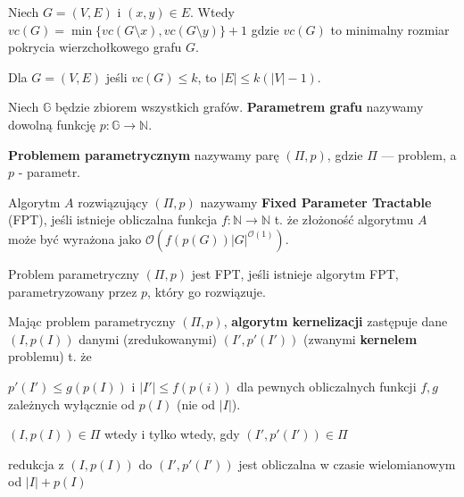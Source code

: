 \begin{lemat}
    Niech $G = (V, E)$ i $(x, y) \in E$. Wtedy
    $vc(G) = \min \{vc(G \setminus x), vc(G \setminus y)\} + 1$
    gdzie $vc(G)$ to minimalny rozmiar pokrycia wierzchołkowego grafu $G$.
\end{lemat}

\begin{lemat}
    Dla $G = (V, E)$ jeśli $vc(G) \leq k$, to $|E| \leq k(|V| - 1)$.
\end{lemat}

\begin{definicja}
    Niech $\mathbb{G}$ będzie zbiorem wszystkich grafów. \textbf{Parametrem grafu}
    nazywamy dowolną funkcję $p : \mathbb{G} \rightarrow \mathbb{N}$.
\end{definicja}

\begin{definicja}
   \textbf{Problemem parametrycznym} nazywamy parę $(\Pi, p)$, gdzie $\Pi$ --- problem, a $p$ - parametr.
\end{definicja}

\begin{definicja}
    Algorytm $A$ rozwiązujący $(\Pi, p)$ nazywamy \textbf{Fixed Parameter Tractable} (FPT),
    jeśli istnieje obliczalna funkcja $f : \mathbb{N} \rightarrow \mathbb{N}$ t. że złożoność
    algorytmu $A$ może być wyrażona jako $\mathcal{O}(f(p(G))|G|^{\mathcal{O}(1)})$.
\end{definicja}

\begin{definicja}
    Problem parametryczny $(\Pi, p)$ jest FPT, jeśli istnieje algorytm FPT,
    parametryzowany przez $p$, który go rozwiązuje.
\end{definicja}

\begin{definicja}
    Mając problem parametryczny $(\Pi, p)$, \textbf{algorytm kernelizacji} zastępuje dane
    $(I, p(I))$ danymi (zredukowanymi) $(I', p'(I'))$ (zwanymi \textbf{kernelem} problemu) t. że
    \begin{enumerate*}[label=\roman*)]
        \item $p'(I') \leq g(p(I))$ i $|I'| \leq f(p(i))$ dla pewnych obliczalnych funkcji $f, g$ zależnych
        wyłącznie od $p(I)$ (nie od $|I|$).
        \item $(I, p(I)) \in \Pi$ wtedy i tylko wtedy, gdy $(I', p'(I')) \in \Pi$
        \item redukcja z $(I, p(I))$ do $(I', p'(I'))$ jest obliczalna w czasie wielomianowym od $|I| + p(I)$
    \end{enumerate*}
\end{definicja}

